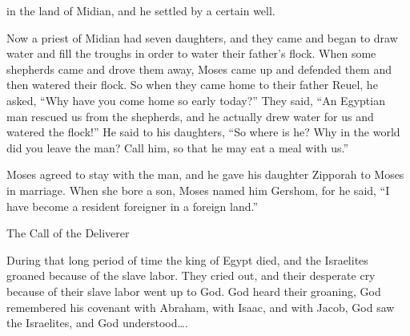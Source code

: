 {in the land
of Midian,
and he settled
by a certain well.
\par }{\PP {}Now a priest
of Midian
had seven
daughters,
and they came
and began to draw
water and fill
the troughs
in order to water
their father’s
flock.
When some shepherds
came
and drove
them away, Moses
came up
and defended
them and then watered
their flock.
So when
they came
home to their father
Reuel,
he asked,
“Why
have you come
home so early
today?”
They said,
“An Egyptian
man
rescued
us from the shepherds,
and he actually
drew water
for us and watered
the flock!”
He said
to
his daughters,
“So where
is he? Why
in the world
did you leave
the
man? Call
him, so that he may eat
a meal with us.”
\par }{\PP {}Moses
agreed
to stay
with
the man,
and he gave
his daughter
Zipporah
to Moses in marriage.
When she bore
a son,
Moses named
him Gershom,
for
he said,
“I have become
a resident foreigner
in a foreign
land.”
\par }{\SH The Call of the Deliverer
\par }{\PP {}During
that long
period of time
the king
of Egypt
died,
and the Israelites
groaned
because of the slave labor.
They cried out,
and their desperate cry
because of their slave labor
went up
to
God.
God
heard
their groaning,
God
remembered
his covenant
with
Abraham,
with
Isaac,
and with
Jacob,
God
saw
the Israelites,
and God
understood….


}
